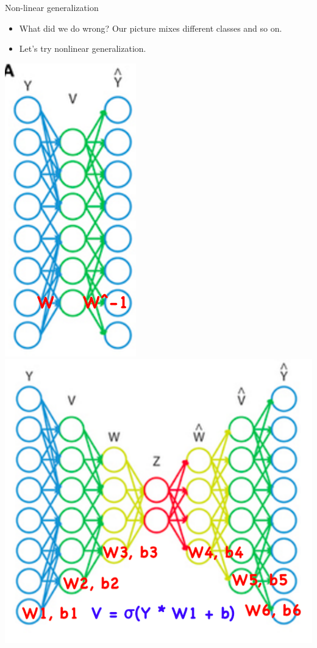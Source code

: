 \documentclass{beamer}
\begin{document}
\begin{frame}{Non-linear generalization}
	\begin{itemize}
		\pause \item What did we do wrong? Our picture mixes different classes and so on.
		\pause \item Let's try nonlinear generalization.
	\end{itemize}
	
	 \begin{center}
	 	\pause \includegraphics[scale=0.3]{img/fcautoenc1} ~~~\pause \includegraphics[scale=0.25]{img/fcautoenc2}		 
	 \end{center}
	

\end{frame}
\end{document}
